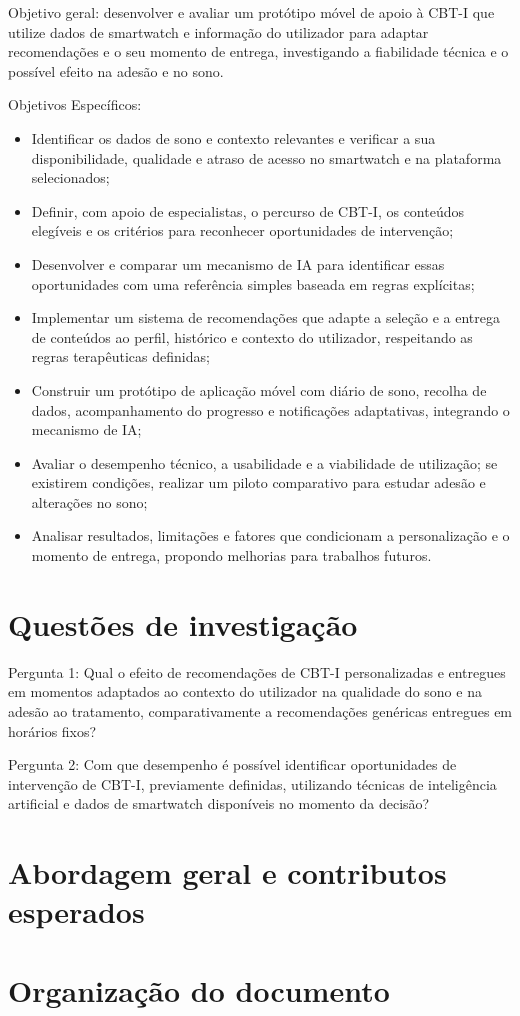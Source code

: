 Objetivo geral: desenvolver e avaliar um protótipo móvel de apoio à CBT-I que utilize dados de smartwatch e informação do utilizador para adaptar recomendações e o seu momento de entrega, investigando a fiabilidade técnica e o possível efeito na adesão e no sono.

Objetivos Específicos:
\begin{itemize}
    \item Identificar os dados de sono e contexto relevantes e verificar a sua disponibilidade, qualidade e atraso de acesso no smartwatch e na plataforma selecionados;
    \item Definir, com apoio de especialistas, o percurso de CBT-I, os conteúdos elegíveis e os critérios para reconhecer oportunidades de intervenção;
    \item Desenvolver e comparar um mecanismo de IA para identificar essas oportunidades com uma referência simples baseada em regras explícitas;
    \item Implementar um sistema de recomendações que adapte a seleção e a entrega de conteúdos ao perfil, histórico e contexto do utilizador, respeitando as regras terapêuticas definidas;
    \item Construir um protótipo de aplicação móvel com diário de sono, recolha de dados, acompanhamento do progresso e notificações adaptativas, integrando o mecanismo de IA;
    \item Avaliar o desempenho técnico, a usabilidade e a viabilidade de utilização; se existirem condições, realizar um piloto comparativo para estudar adesão e alterações no sono;
    \item Analisar resultados, limitações e fatores que condicionam a personalização e o momento de entrega, propondo melhorias para trabalhos futuros.
\end{itemize}


\section{Questões de investigação} 
\label{sec:chap1_researchQuestions} %

Pergunta 1:
Qual o efeito de recomendações de CBT-I personalizadas e entregues em momentos adaptados ao contexto do utilizador na qualidade do sono e na adesão ao tratamento, comparativamente a recomendações genéricas entregues em horários fixos?

Pergunta 2:
Com que desempenho é possível identificar oportunidades de intervenção de CBT-I, previamente definidas, utilizando técnicas de inteligência artificial e dados de smartwatch disponíveis no momento da decisão?

\section{Abordagem geral e contributos esperados} 
\label{sec:chap1_approach} %

\section{Organização do documento} 
\label{sec:chap1_organization} %
